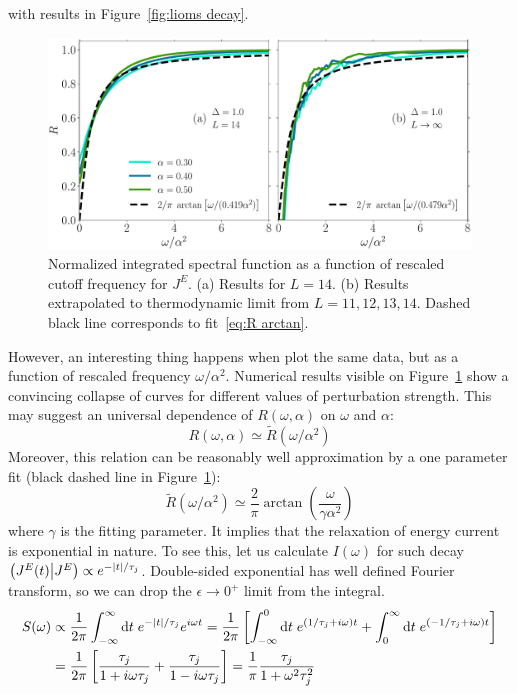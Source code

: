 with results in Figure~\ref{fig:lioms decay}.
\begin{figure}[ht]
  \centering
  \includegraphics[width=\figsize\textwidth]{Figures/current_scaling.pdf}
  \caption{Normalized integrated spectral function as a function of rescaled cutoff frequency for \(J^E\).
  (a) Results for \(L=14\). (b) Results extrapolated to thermodynamic limit from \(L=11,12,13,14\).
  Dashed black line corresponds to fit~\eqref{eq:R arctan}.}
  \label{fig:current decay scaling}
\end{figure}
However, an interesting thing happens when plot the same data, but as a function of rescaled
frequency \(\omega/\alpha^2\). Numerical results visible on Figure~\ref{fig:current decay scaling}
show a convincing collapse of curves for different values of perturbation strength. This may suggest
an universal dependence of \(R(\omega,\alpha)\) on \(\omega\) and \(\alpha\):
\begin{equation}
  R(\omega,\alpha)\simeq \tilde{R}(\omega/\alpha^2)
  \label{eq:universal scaling current}
\end{equation}
Moreover, this relation can be reasonably well approximation by a one parameter fit
(black dashed line in Figure~\ref{fig:current decay scaling}):
\begin{equation}
  \tilde{R}(\omega/\alpha^2) \simeq \frac{2}{\pi} \arctan\left(\frac{\omega}{\gamma \alpha^2}\right)
\label{eq:R arctan}
\end{equation}
where \(\gamma \) is the fitting parameter. It implies that the relaxation of energy current
is exponential in nature. To see this, let us calculate \(I(\omega)\) for such decay
\(\left(J^E(t) \middle| J^E\right) \propto e^{-\abs{t}/\tau_{j}}\). Double-sided exponential has well defined Fourier
transform, so we can drop the \(\epsilon \to 0^{+}\) limit from the integral.
\begin{align}
  S(\omega) &\propto \frac{1}{2\pi} \int_{-\infty}^{\infty} \mathrm{d} t\; e^{-\abs{t}/\tau_{j}} e^{i \omega t} = 
  \frac{1}{2\pi} \left[\int_{-\infty}^{0} \mathrm{d} t\; e^{(1/\tau_{j} + i\omega)t }
  + \int_{0}^{\infty} \mathrm{d} t\; e^{(-1/\tau_{j} + i\omega)t }  \right] \nonumber \\
  &= \frac{1}{2\pi} \left[\frac{\tau_{j}}{1+i\omega \tau_{j}} + \frac{\tau_{j}}{1-i\omega\tau_{j}}\right] = 
  \frac{1}{\pi} \frac{\tau_{j}}{1+\omega^2\tau_{j}^2}
\end{align}
